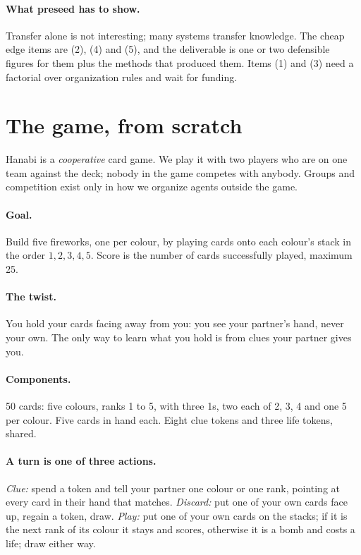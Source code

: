\documentclass[11pt]{article}
\begin{document}
\paragraph{What preseed has to show.} Transfer alone is not interesting; many systems transfer knowledge. The cheap
edge items are (2), (4) and (5), and the deliverable is one or two defensible figures for them plus the methods that
produced them. Items (1) and (3) need a factorial over organization rules and wait for funding.

\section{The game, from scratch}\label{sec:game}

Hanabi is a \emph{cooperative} card game. We play it with two players who are on one team against the deck; nobody in
the game competes with anybody. Groups and competition exist only in how we organize agents outside the game.

\paragraph{Goal.} Build five fireworks, one per colour, by playing cards onto each colour's stack in the order
$1,2,3,4,5$. Score is the number of cards successfully played, maximum 25.

\paragraph{The twist.} You hold your cards facing away from you: you see your partner's hand, never your own. The
only way to learn what you hold is from clues your partner gives you.

\paragraph{Components.} 50 cards: five colours, ranks 1 to 5, with three 1s, two each of 2, 3, 4 and one 5 per
colour. Five cards in hand each. Eight clue tokens and three life tokens, shared.

\paragraph{A turn is one of three actions.} \emph{Clue:} spend a token and tell your partner one colour or one rank,
pointing at every card in their hand that matches. \emph{Discard:} put one of your own cards face up, regain a token,
draw. \emph{Play:} put one of your own cards on the stacks; if it is the next rank of its colour it stays and scores,
otherwise it is a bomb and costs a life; draw either way.
\end{document}
